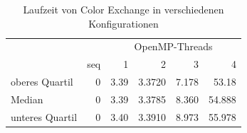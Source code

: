 \documentclass[10pt,a4paper]{article}
\begin{document}
\begin{table}[H]
\centering
\begin{tabular}{lrrrrr}
\toprule
 & & \multicolumn{4}{c}{OpenMP-Threads} \\
\cmidrule(r){3-6}
 & seq & 1 & 2 & 3 & 4 \\
oberes Quartil 	& 0 		& 3.39 		& 3.3720 		& 7.178 		& 53.18 \\
Median 			& 0 		& 3.39 		& 3.3785 		& 8.360 		& 54.888 \\
unteres Quartil 	& 0 		& 3.40 		& 3.3910 		& 8.973 		& 55.978 \\
\bottomrule
\end{tabular}
\caption{Laufzeit von Color Exchange in verschiedenen Konfigurationen}
\label{tab:CE_runtime}
\end{table}




\end{document}
